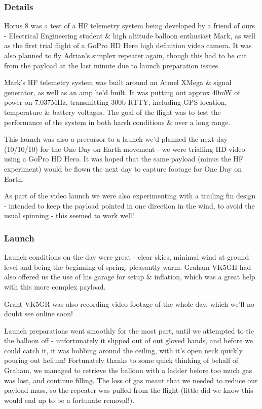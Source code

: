\documentclass[a4paper,12pt]{article}
\begin{document}
\begin{appendices}
\subsubsection*{Details}

Horus 8 was a test of a HF telemetry system being developed by a friend of ours - Electrical Engineering student \& high altitude balloon enthusiast Mark, as well as the first trial flight of a GoPro HD Hero high definition video camera. It was also planned to fly Adrian's simplex repeater again, though this had to be cut from the payload at the last minute due to launch preparation issues.

Mark's HF telemetry system was built around an Atmel XMega \& signal generator, as well as an amp he'd built. It was putting out approx 40mW of power on 7.037MHz, transmitting 300b RTTY, including GPS location, temperature \& battery voltages. The goal of the flight was to test the performance of the system in both harsh conditions \& over a long range.

This launch was also a precursor to a launch we'd planned the next day (10/10/10) for the One Day on Earth movement - we were trialling HD video using a GoPro HD Hero. It was hoped that the same payload (minus the HF experiment) would be flown the next day to capture footage for One Day on Earth.

As part of the video launch we were also experimenting with a trailing fin design - intended to keep the payload pointed in one direction in the wind, to avoid the usual spinning - this seemed to work well!



\subsubsection*{Launch}

Launch conditions on the day were great - clear skies, minimal wind at ground level and being the beginning of spring, pleasantly warm. Graham VK5GH had also offered us the use of his garage for setup \& inflation, which was a great help with this more complex payload.

Grant VK5GR was also recording video footage of the whole day, which we'll no doubt see online soon!

Launch preparations went smoothly for the most part, until we attempted to tie the balloon off - unfortunately it slipped out of out gloved hands, and before we could catch it, it was bobbing around the ceiling, with it's open neck quickly pouring out helium!  Fortunately thanks to some quick thinking of behalf of Graham, we managed to retrieve the balloon with a ladder before too much gas was lost, and continue filling. The loss of gas meant that we needed to reduce our payload mass, so the repeater was pulled from the flight (little did we know this would end up to be a fortunate removal!).


\end{appendices}
\end{document}

